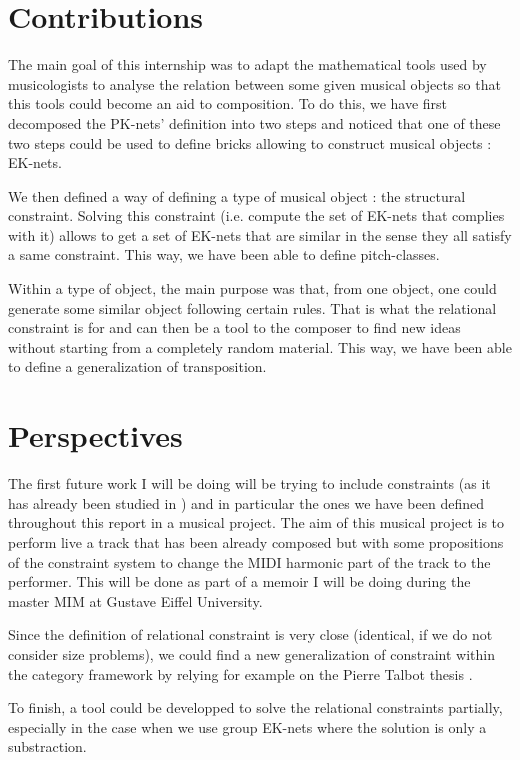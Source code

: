 \section{Contributions}
The main goal of this internship was to adapt the mathematical tools used by musicologists to analyse the relation between some given musical objects so that this tools could become an aid to composition. To do this, we have first decomposed the PK-nets' definition into two steps and noticed that one of these two steps could be used to define bricks allowing to construct musical objects : EK-nets.

We then defined a way of defining a type of musical object : the structural constraint. Solving this constraint (i.e. compute the set of EK-nets that complies with it) allows to get a set of EK-nets that are similar in the sense they all satisfy a same constraint. This way, we have been able to define pitch-classes.%

Within a type of object, the main purpose was that, from one object, one could generate some similar object following certain rules. That is what the relational constraint is for and can then be a tool to the composer to find new ideas without starting from a completely random material. This way, we have been able to define a generalization of transposition. %

\section{Perspectives}

The first future work I will be doing will be trying to include constraints (as it has already been studied in \cite{talbot2017interactive}) and in particular the ones we have been defined throughout this report in a musical project.  The aim of this musical project is to perform live a track that has been already composed but with some propositions of the constraint system to change the MIDI harmonic part of the track to the performer. This will be done as part of a memoir I will be doing during the master MIM at Gustave Eiffel University.

Since the definition of relational constraint is very close (identical, if we do not consider size problems), we could find a new generalization of constraint within the category framework by relying for example on the Pierre Talbot thesis \cite{talbot2018spacetime}.

To finish, a tool could be developped to solve the relational constraints partially, especially in the case when we use group EK-nets where the solution is only a substraction.